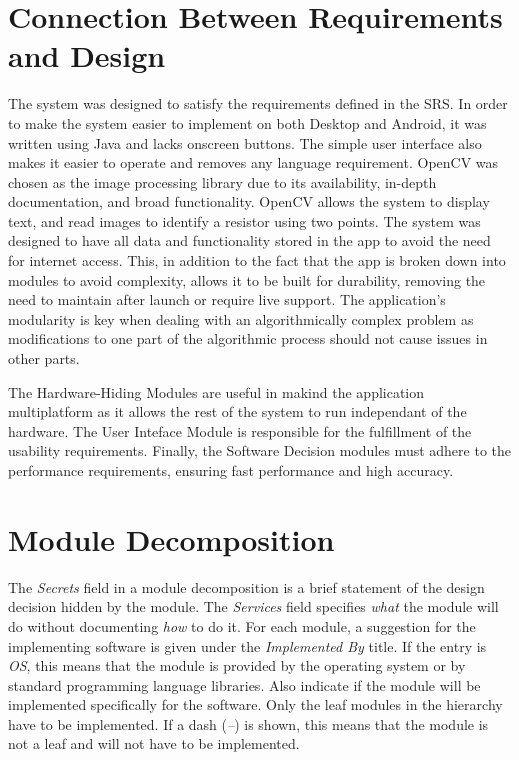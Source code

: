 \documentclass[12pt, titlepage]{article}
\begin{document}
\section{Connection Between Requirements and Design} \label{SecConnection}
\par The system was designed to satisfy the requirements defined in the SRS. In order to make the system easier to implement on both Desktop and Android, it was written using Java and lacks onscreen buttons. The simple user interface also makes it easier to operate and removes any language requirement. OpenCV was chosen as the image processing library due to its availability, in-depth documentation, and broad functionality. OpenCV allows the system to display text, and read images to identify a resistor using two points. 
The system was designed to have all data and functionality stored in the app to avoid the need for internet access. This, in addition to the fact that the app is broken down into modules to avoid complexity, allows it to be built for durability, removing the need to maintain after launch or require live support. The application’s modularity is key when dealing with an algorithmically complex problem as modifications to one part of the algorithmic process should not cause issues in other parts.
\par The Hardware-Hiding Modules are useful in makind the application multiplatform as it allows the rest of the system to run independant of the hardware. The User Inteface Module is responsible for the fulfillment of the usability requirements. Finally, the Software Decision modules must adhere to the performance requirements, ensuring fast performance and high accuracy.

\section{Module Decomposition} \label{SecMD}

The \emph{Secrets} field in a module decomposition is a brief statement of the design decision hidden by the module. 
The \emph{Services} field specifies \emph{what} the module will do without documenting \emph{how} to do it. 
For each module, a suggestion for the implementing software is given under the \emph{Implemented By} title. 
If the entry is \emph{OS}, this means that the module is provided by the operating system or by standard programming language libraries.
Also indicate if the module will be implemented specifically for the software.
Only the leaf modules in the hierarchy have to be implemented. 
If a dash (\emph{--}) is shown, this means that the module is not a leaf and will not have to be implemented. 
\end{document}
